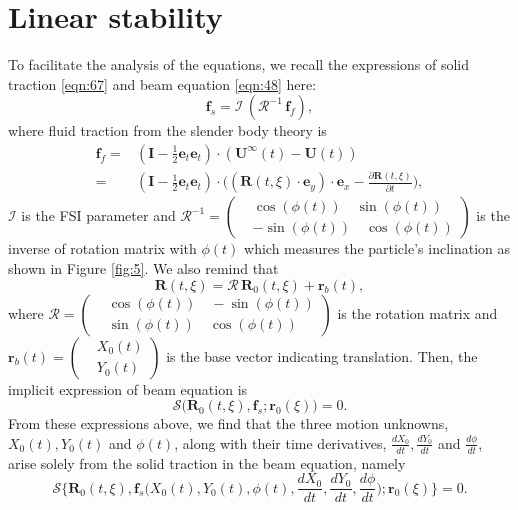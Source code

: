 \documentclass[a4paper,12pt]{article}
\begin{document}
\section{Linear stability}
To facilitate the analysis of the equations, we recall the expressions of solid traction \eqref{eqn:67} and beam equation  \eqref{eqn:48} here:
\begin{equation}
	\label{eqn:104}
		\textbf{f}_s=\mathcal{I}\,\left(\bm{\mathcal{R}}^{-1}\,\textbf{f}_f\right),
\end{equation}
where fluid traction from the slender body theory is 
\begin{equation}
	\label{eqn:105}
	\begin{aligned}
		\textbf{f}_f=&\left(\mathbf{I}-\frac{1}{2}\mathbf{e}_t\mathbf{e}_t\right)\cdot(\mathbf{U}^{\infty}(t)-\mathbf{U}(t))\\
		=&\left(\mathbf{I}-\frac{1}{2}\mathbf{e}_t\mathbf{e}_t\right)\cdot\Big((\bm{\bm{R}}(t,\xi)\cdot\textbf{e}_y)\cdot\textbf{e}_x-\frac{\partial\textbf{R}(t,\xi)}{\partial t}\Big),
	\end{aligned}
\end{equation}
$\mathcal{I}$ is the FSI parameter and  $\bm{\mathcal{R}}^{-1}=\left(\begin{aligned}
	&\cos(\phi(t))\quad \sin(\phi(t)) \\
	&-\sin(\phi(t))\quad \cos(\phi(t))
\end{aligned}\right)$ is the inverse of rotation matrix with $\phi(t)$ which measures the particle's inclination as shown in Figure \ref{fig:5}. We also remind that 
\begin{equation}
	\label{eqn:49}
	\textbf{R}(t,\xi)=\bm{\mathcal{R}}\,\textbf{R}_0(t,\xi)+\textbf{r}_b(t),
\end{equation}
where $\bm{\mathcal{R}}=\left(\begin{aligned}
	&\cos(\phi(t))\quad -\sin(\phi(t)) \\
	&\sin(\phi(t))\quad \cos(\phi(t))
\end{aligned}\right)$ is the rotation matrix and $\bm{r}_b(t)=\left(\begin{aligned}
&X_0(t) \\
&Y_0(t)
\end{aligned}\right)$ is the base vector indicating translation.
Then, the implicit expression of beam equation is 
\begin{equation}
	\label{eqn:106}
	\bm{\mathcal{S}}\Big(\textbf{R}_0(t,\xi),\textbf{f}_s;\textbf{r}_0(\xi)\Big)=0.
\end{equation}
From these expressions above, we find that the three motion unknowns, $X_0(t), Y_0(t)$ and $\phi(t)$, along with their time derivatives,  $\frac{dX_0}{dt}, \frac{dY_0}{dt}$ and $\frac{d\phi}{dt}$, arise solely from the solid traction in the beam equation, namely 	
\begin{equation}
	\label{eqn:107}
\bm{\mathcal{S}}\Big\{\textbf{R}_0(t,\xi),\textbf{f}_s\Big(X_0(t), Y_0(t),\phi(t),\frac{dX_0}{dt}, \frac{dY_0}{dt},\frac{d\phi}{dt}\Big);\textbf{r}_0(\xi)\Big\}=0.
\end{equation}
\end{document}
